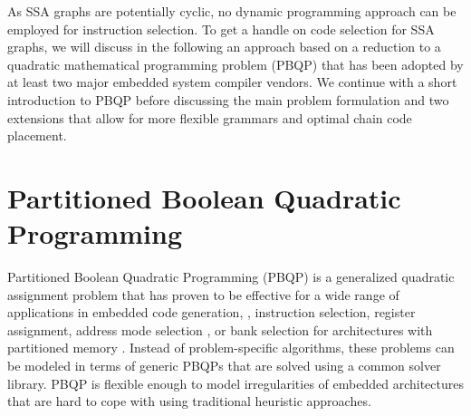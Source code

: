 As SSA graphs are potentially cyclic, no dynamic
programming approach can be employed for instruction selection. To get
a handle on code selection for SSA graphs, we will discuss in the following
an approach based on a reduction to a quadratic mathematical programming
problem (PBQP) \cite{EcksteinKS03,1269857,Ebner08} that has been adopted
by at least two major embedded system compiler vendors. We continue with a short
introduction to PBQP before discussing the main problem formulation
and two extensions that allow for more flexible grammars and optimal
chain code placement.

\section{Partitioned Boolean Quadratic Programming}
Partitioned Boolean Quadratic Programming
(PBQP) is a generalized quadratic assignment problem that has proven
to be effective for a wide range of applications in embedded code
generation, \eg, instruction selection, register assignment, address
mode selection \cite{Eck03}, or bank selection for architectures with
partitioned memory \cite{journals/tecs/ScholzBX08}. Instead of
problem-specific algorithms, these problems can be modeled in terms of
generic {PBQP}s that are solved using a common solver library. PBQP
is flexible enough to model irregularities of embedded architectures
that are hard to cope with using traditional heuristic approaches.

